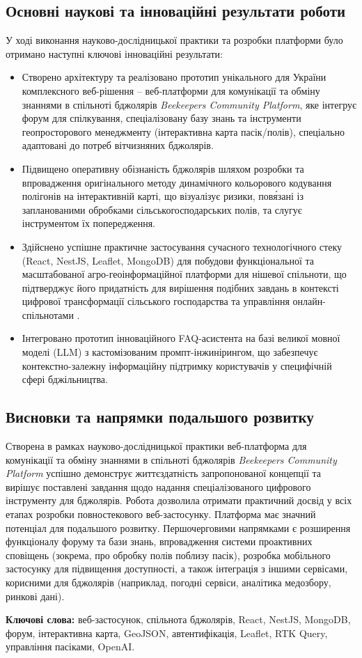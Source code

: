 \subsection*{Основні наукові та інноваційні результати роботи}
У ході виконання науково-дослідницької практики та розробки платформи було отримано наступні ключові інноваційні результати:
\begin{itemize}
    \item Створено архітектуру та реалізовано прототип унікального для України комплексного веб-рішення – веб-платформи для комунікації та обміну знаннями в спільноті бджолярів \textit{Beekeepers Community Platform}, яке інтегрує форум для спілкування, спеціалізовану базу знань та інструменти геопросторового менеджменту (інтерактивна карта пасік/полів), спеціально адаптовані до потреб вітчизняних бджолярів.
    \item Підвищено оперативну обізнаність бджолярів шляхом розробки та впровадження оригінального методу динамічного кольорового кодування полігонів на інтерактивній карті, що візуалізує ризики, пов\'язані із запланованими обробками сільськогосподарських полів, та слугує інструментом їх попередження.
    \item Здійснено успішне практичне застосування сучасного технологічного стеку (React, NestJS, Leaflet, MongoDB) для побудови функціональної та масштабованої агро-геоінформаційної платформи для нішевої спільноти, що підтверджує його придатність для вирішення подібних завдань в контексті цифрової трансформації сільського господарства та управління онлайн-спільнотами \cite{preece2005onlinecommunities, huet2022digitalbeekeeping, guruprasad2024beeopen}.
    \item Інтегровано прототип інноваційного FAQ-асистента на базі великої мовної моделі (LLM) з кастомізованим промпт-інжинірингом, що забезпечує контекстно-залежну інформаційну підтримку користувачів у специфічній сфері бджільництва.
\end{itemize}

\subsection*{Висновки та напрямки подальшого розвитку}
Створена в рамках науково-дослідницької практики веб-платформа для комунікації та обміну знаннями в спільноті бджолярів \textit{Beekeepers Community Platform} успішно демонструє життєздатність запропонованої концепції та вирішує поставлені завдання щодо надання спеціалізованого цифрового інструменту для бджолярів. Робота дозволила отримати практичний досвід у всіх етапах розробки повностекового веб-застосунку. Платформа має значний потенціал для подальшого розвитку. Першочерговими напрямками є розширення функціоналу форуму та бази знань, впровадження системи проактивних сповіщень (зокрема, про обробку полів поблизу пасік), розробка мобільного застосунку для підвищення доступності, а також інтеграція з іншими сервісами, корисними для бджолярів (наприклад, погодні сервіси, аналітика медозбору, ринкові дані).

\textbf{Ключові слова:} веб-застосунок, спільнота бджолярів, React, NestJS, MongoDB, форум, інтерактивна карта, GeoJSON, автентифікація, Leaflet, RTK Query, управління пасіками, OpenAI.

\newpage 